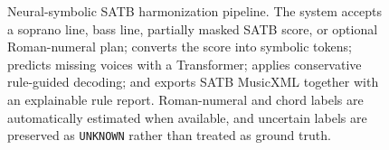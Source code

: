 \begin{figure}[t]
\centering
{}%
\caption{Neural-symbolic SATB harmonization pipeline. The system accepts a soprano line, bass line, partially masked SATB score, or optional Roman-numeral plan; converts the score into symbolic tokens; predicts missing voices with a Transformer; applies conservative rule-guided decoding; and exports SATB MusicXML together with an explainable rule report. Roman-numeral and chord labels are automatically estimated when available, and uncertain labels are preserved as \texttt{UNKNOWN} rather than treated as ground truth.}
\label{fig:project1-method}
\end{figure}
